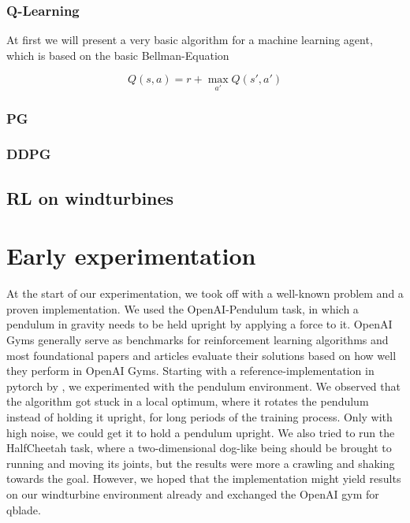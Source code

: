 \documentclass[hyperref,german,beleg]{cgvpub}
\begin{document}
\subsection{Q-Learning}

At first we will present a very basic algorithm for a machine learning agent, which is based on the basic Bellman-Equation \cite{bellmanTheoryDynamicProgramming1954}

\begin{equation}
Q(s, a) = r + \max_{a'}Q(s', a')
\end{equation}





\subsection{PG}


\subsection{DDPG}



\section{RL on windturbines}


\chapter{Early experimentation}

At the start of our experimentation, we took off with a well-known problem and a proven implementation. We used the OpenAI-Pendulum task, in which a pendulum in gravity needs to be held upright by applying a force to it. OpenAI Gyms generally serve as benchmarks for reinforcement learning algorithms and most foundational papers and articles evaluate their solutions based on how well they perform in OpenAI Gyms. Starting with a reference-implementation in pytorch by \cite{DeepDeterministicPolicy}, we experimented with the pendulum environment. We observed that the algorithm got stuck in a local optimum, where it rotates the pendulum instead of holding it upright, for long periods of the training process. Only with high noise, we could get it to hold a pendulum upright. We also tried to run the HalfCheetah task, where a two-dimensional dog-like being should be brought to running and moving its joints, but the results were more a crawling and shaking towards the goal. However, we hoped that the implementation might yield results on our windturbine environment already and exchanged the OpenAI gym for qblade.
\end{document}

